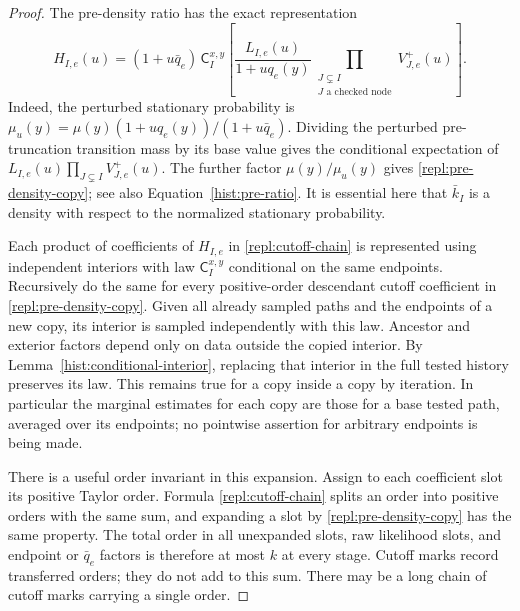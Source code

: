 \begin{proof}
The pre-density ratio has the exact representation
\begin{equation}\label{repl:pre-density-copy}
 H_{I,e}(u)
 =(1+u \bar q_e)\,
 \mathsf C_I^{x,y}\left[
    \frac{L_{I,e}(u)}{1+u q_e(y)}
    \prod_{\substack{J\subsetneq I\\J\text{ a checked node}}}
           V_{J,e}^+(u)\right].
\end{equation}
Indeed, the perturbed stationary probability is
$\mu_u(y)=\mu(y)(1+u q_e(y))/(1+u \bar q_e)$.  Dividing the perturbed
pre-truncation transition mass by its base value gives the conditional
expectation of $L_{I,e}(u)\prod_{J\subsetneq I}V_{J,e}^+(u)$.
The further factor $\mu(y)/\mu_u(y)$ gives
\eqref{repl:pre-density-copy}; see also Equation~\eqref{hist:pre-ratio}.
It is essential here that $\bar k_I$ is a density with respect to the
normalized stationary probability.

Each product of coefficients of $H_{I,e}$ in \eqref{repl:cutoff-chain}
is represented using independent interiors with law $\mathsf C_I^{x,y}$
conditional on the same endpoints.  Recursively do the same for every
positive-order descendant cutoff coefficient in
\eqref{repl:pre-density-copy}.  Given all already sampled paths and the
endpoints of a new copy, its interior is sampled independently with this
law.  Ancestor and exterior factors depend only on data outside the copied
interior.  By Lemma~\ref{hist:conditional-interior}, replacing that interior in
the full tested history preserves its law.  This remains true for a copy
inside a copy by iteration.  In particular the marginal estimates for each
copy are those for a base tested path, averaged over its endpoints; no
pointwise assertion for arbitrary endpoints is being made.

There is a useful order invariant in this expansion.  Assign to each
coefficient slot its positive Taylor order.  Formula
\eqref{repl:cutoff-chain} splits an order into positive orders with the
same sum, and expanding a slot by \eqref{repl:pre-density-copy} has the
same property.  The total order in all unexpanded slots, raw likelihood
slots, and endpoint or $\bar q_e$ factors is therefore at most $k$ at every
stage.  Cutoff marks record transferred orders; they do not add to this sum.
There may be a long chain of cutoff marks carrying a single order.


\end{proof}
